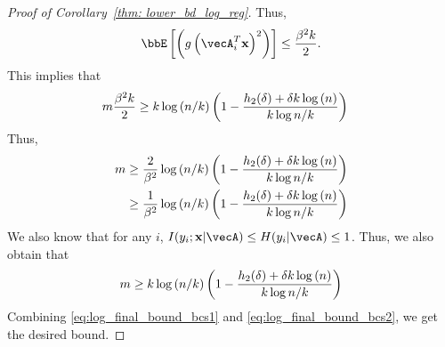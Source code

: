 \begin{proof}[Proof of Corollary~\ref{thm: lower_bd_log_reg}]
Thus, 
\begin{align*}
\bbE\insq{\inp{g\inp{\vecA_i^T\bx}^2}} \leq \frac{\beta^2k}{2}.
\end{align*}
This implies that
\begin{align*}
m\frac{\beta^2k}{2} &\geq  k\log\left(n/k\right)\left(1-\frac{h_2(\delta)+ \delta k\log\left(n\right)}{k\log{n/k}}\right)
\end{align*}
Thus,
\begin{align}
m&\geq \frac{2}{\beta^2}\log\left(n/k\right)\left(1-\frac{h_2(\delta)+ \delta k\log\left(n\right)}{k\log{n/k}}\right)\nonumber\\
&\geq \frac{1}{\beta^2}\log\left(n/k\right)\left(1-\frac{h_2(\delta)+ \delta k\log\left(n\right)}{k\log{n/k}}\right)\label{eq:log_final_bound_bcs1}
\end{align}
We also  know that for any $i$, $I(y_i;\bx|\vecA)\leq H(y_i|\vecA)\leq 1$. Thus, we also obtain that
\begin{align}
m\geq k\log\left(n/k\right)\left(1-\frac{h_2(\delta)+ \delta k\log\left(n\right)}{k\log{n/k}}\right)\label{eq:log_final_bound_bcs2}
\end{align}
Combining \eqref{eq:log_final_bound_bcs1} and \eqref{eq:log_final_bound_bcs2}, we get the desired bound.
\end{proof}



